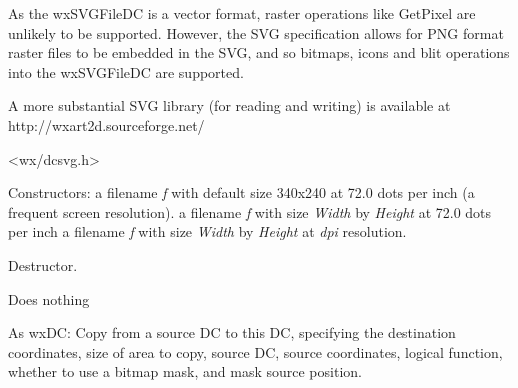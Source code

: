 As the wxSVGFileDC is a vector format, raster operations like GetPixel are unlikely to be supported.
However, the SVG specification allows for PNG format raster files to be embedded in the SVG, and so 
bitmaps, icons and blit operations into the wxSVGFileDC are supported.

A more substantial SVG library (for reading and writing) is available at 
http://wxart2d.sourceforge.net/




<wx/dcsvg.h>






  \rtfsp
{}  \rtfsp
{} \rtfsp

Constructors: 
a filename {\it f} with default size 340x240 at 72.0 dots per inch (a frequent screen resolution).
a filename {\it f} with size {\it Width} by {\it Height} at 72.0 dots per inch 
a filename {\it f} with size {\it Width} by {\it Height} at {\it dpi} resolution.



Destructor.

\label{wxdcbegindrawing}

Does nothing

\label{wxdcblit}


As wxDC: Copy from a source DC to this DC, specifying the destination
coordinates, size of area to copy, source DC, source coordinates,
logical function, whether to use a bitmap mask, and mask source position.

